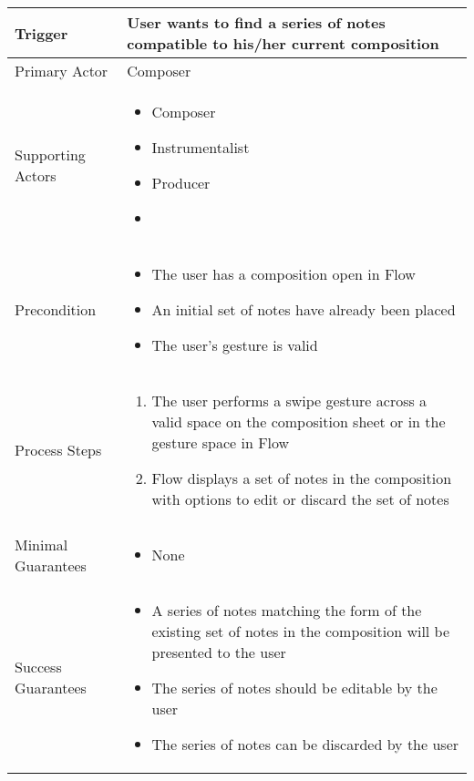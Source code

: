 \begin{longtable}{|X|X|}
\hline
Trigger & User wants to find a series of notes compatible to his/her current composition \\
\hline
Primary Actor & Composer\\
\hline
Supporting Actors & 
\begin{itemize}
\item Composer
\item Instrumentalist
\item Producer
\item
\end{itemize}\\
\hline
Precondition & 
\begin{itemize}
\item The user has a composition open in Flow
\item An initial set of notes have already been placed
\item The user's gesture is valid
\end{itemize}\\
\hline
Process Steps & 
\begin{enumerate}
\item The user performs a swipe gesture across a valid space on the composition sheet or in the gesture space in Flow
\item Flow displays a set of notes in the composition with options to edit or discard the set of notes
\end{enumerate} \\
\hline
Minimal Guarantees &
\begin{itemize}
	\item None
\end{itemize} \\
\hline
Success Guarantees &
\begin{itemize}
	\item A series of notes matching the form of the existing set of notes in the composition will be presented to the user 
	\item The series of notes should be editable by the user
	\item The series of notes can be discarded by the user
\end{itemize} \\
\hline
\end{longtable}